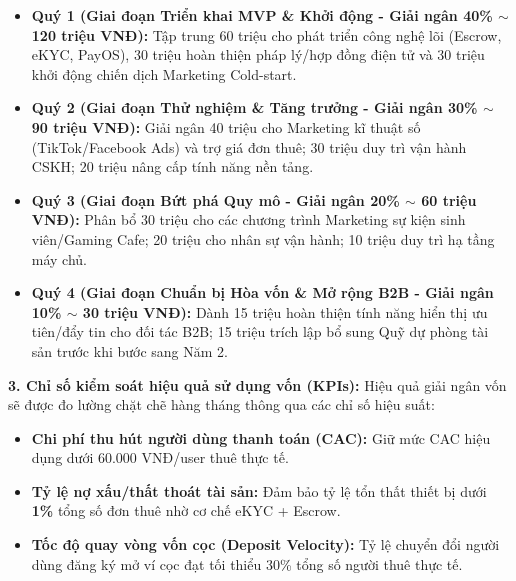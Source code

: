 \begin{itemize}
    \item \textbf{Quý 1 (Giai đoạn Triển khai MVP \& Khởi động - Giải ngân 40\% $\sim$ 120 triệu VNĐ):}
    Tập trung 60 triệu cho phát triển công nghệ lõi (Escrow, eKYC, PayOS), 30 triệu hoàn thiện pháp lý/hợp đồng điện tử và 30 triệu khởi động chiến dịch Marketing Cold-start.
    
    \item \textbf{Quý 2 (Giai đoạn Thử nghiệm \& Tăng trưởng - Giải ngân 30\% $\sim$ 90 triệu VNĐ):}
    Giải ngân 40 triệu cho Marketing kĩ thuật số (TikTok/Facebook Ads) và trợ giá đơn thuê; 30 triệu duy trì vận hành CSKH; 20 triệu nâng cấp tính năng nền tảng.
    
    \item \textbf{Quý 3 (Giai đoạn Bứt phá Quy mô - Giải ngân 20\% $\sim$ 60 triệu VNĐ):}
    Phân bổ 30 triệu cho các chương trình Marketing sự kiện sinh viên/Gaming Cafe; 20 triệu cho nhân sự vận hành; 10 triệu duy trì hạ tầng máy chủ.
    
    \item \textbf{Quý 4 (Giai đoạn Chuẩn bị Hòa vốn \& Mở rộng B2B - Giải ngân 10\% $\sim$ 30 triệu VNĐ):}
    Dành 15 triệu hoàn thiện tính năng hiển thị ưu tiên/đẩy tin cho đối tác B2B; 15 triệu trích lập bổ sung Quỹ dự phòng tài sản trước khi bước sang Năm 2.
\end{itemize}

\textbf{3. Chỉ số kiểm soát hiệu quả sử dụng vốn (KPIs):}
Hiệu quả giải ngân vốn sẽ được đo lường chặt chẽ hàng tháng thông qua các chỉ số hiệu suất:
\begin{itemize}
    \item \textbf{Chi phí thu hút người dùng thanh toán (CAC):} Giữ mức CAC hiệu dụng dưới 60.000 VNĐ/user thuê thực tế.
    \item \textbf{Tỷ lệ nợ xấu/thất thoát tài sản:} Đảm bảo tỷ lệ tổn thất thiết bị dưới \textbf{1\%} tổng số đơn thuê nhờ cơ chế eKYC + Escrow.
    \item \textbf{Tốc độ quay vòng vốn cọc (Deposit Velocity):} Tỷ lệ chuyển đổi người dùng đăng ký mở ví cọc đạt tối thiểu 30\% tổng số người thuê thực tế.
\end{itemize}
